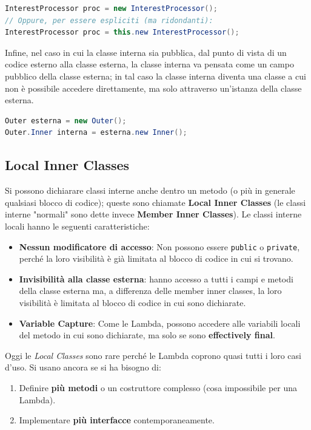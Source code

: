 \begin{lstlisting}[language=Java, caption={Creazione di un'istanza della classe interna}]
InterestProcessor proc = new InterestProcessor(); 
// Oppure, per essere espliciti (ma ridondanti):
InterestProcessor proc = this.new InterestProcessor();
\end{lstlisting}

Infine, nel caso in cui la classe interna sia pubblica, dal punto di vista di un codice esterno alla classe esterna, la classe interna va pensata come un campo pubblico della classe esterna; in tal caso la classe interna diventa una classe a cui non è possibile accedere direttamente, ma solo attraverso un'istanza della classe esterna.
\begin{lstlisting}[language=Java, caption={Riferimento alla classe interna da un contesto esterno}]
Outer esterna = new Outer();
Outer.Inner interna = esterna.new Inner();
\end{lstlisting}

 \subsection{Local Inner Classes}

 Si possono dichiarare classi interne anche dentro un metodo (o più in generale qualsiasi blocco di codice); queste sono chiamate \textbf{Local Inner Classes} (le classi interne "normali" sono dette invece \textbf{Member Inner Classes}). Le classi interne locali hanno le seguenti caratteristiche:

\begin{itemize}
    \item \textbf{Nessun modificatore di accesso}: Non possono essere \texttt{public} o \texttt{private}, perché la loro visibilità è già limitata al blocco di codice in cui si trovano.
    \item \textbf{Invisibilità alla classe esterna}: hanno accesso a tutti i campi e metodi della classe esterna ma, a differenza delle member inner classes, la loro visibilità è limitata al blocco di codice in cui sono dichiarate.
    \item \textbf{Variable Capture}: Come le Lambda, possono accedere alle variabili locali del metodo in cui sono dichiarate, ma solo se sono \textbf{effectively final}. 
\end{itemize}
\vspace{\baselineskip}

Oggi le \textit{Local Classes} sono rare perché le Lambda coprono quasi tutti i loro casi d'uso. Si usano ancora se si ha bisogno di:
\begin{enumerate}
    \item Definire \textbf{più metodi} o un costruttore complesso (cosa impossibile per una Lambda).
    \item Implementare \textbf{più interfacce} contemporaneamente.
\end{enumerate}



